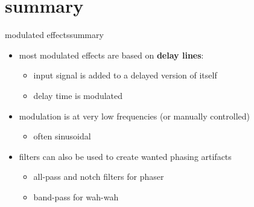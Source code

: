         \section{summary}
        \begin{frame}{modulated effects}{summary}
            \begin{itemize}
                \item	most modulated effects are based on \textbf{delay lines}: 
                    \begin{itemize}
                        \item   input signal is added to a delayed version of itself
                        \item   delay time is modulated
                    \end{itemize}
                    
                \bigskip
                \item<2->	modulation is at very low frequencies (or manually controlled)
                    \begin{itemize}
                        \item   often sinusoidal
                    \end{itemize}
                \bigskip
                \item<3->	filters can also be used to create wanted phasing artifacts
                    \begin{itemize}
                        \item   all-pass and notch filters for phaser
                        \item   band-pass for wah-wah
                    \end{itemize}
            \end{itemize}
        \end{frame}





